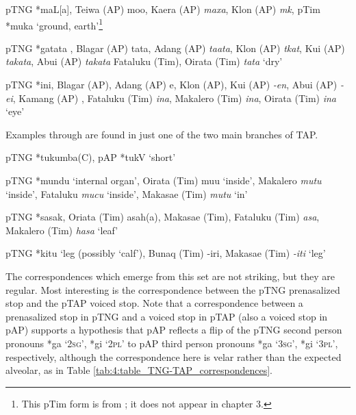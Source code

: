 \ea%
\label{ex:4:41}
\upshape   pTNG *maL[a], 
Teiwa (AP) mo{\pharfric}o{\textglotstop}, 
Kaera (AP) \textit{maxa}, 
Klon (AP) \textit{m{\textschwa}k{\textepsilon}{\textglotstop}}, 
pTim *muka `ground, earth'\footnote{This pTim form is from \citet{SchapperEtAl2012historical}; it does not appear in chapter 3.}  
\z

\ea%
\label{ex:4:42}
\upshape    pTNG *gatata , Blagar (AP) tata, Adang (AP) \textit{ta}\textit{{\textglotstop}}\textit{ata}, Klon (AP) \textit{t}\textit{{\textschwa}}\textit{kat}, Kui (AP) \textit{takata}, Abui (AP) \textit{takata} Fataluku (Tim), Oirata (Tim) \textit{tata} `dry'  
\z

\ea%
\label{ex:4:43}
\upshape  pTNG *ini, Blagar (AP), Adang (AP) e{\ng}, Klon (AP), Kui (AP) \textit{-en}, Abui (AP) \textit{-ei{\ng}}, Kamang (AP) \textit{{\ng}}, Fataluku (Tim) \textit{ina}, Makalero (Tim) \textit{ina}, Oirata (Tim) \textit{ina} `eye' 
   \z

Examples  through  are found in just one of the two main branches of TAP.

\ea%
\label{ex:4:44}
\upshape    pTNG *tukumba(C), pAP *tukV `short'  
\z

\ea%
\label{ex:4:45}
\upshape    pTNG *mundu `internal organ', Oirata (Tim) mu{\textrtailt}u `inside', Makalero \textit{mutu} `inside', Fataluku \textit{mucu }`inside', Makasae (Tim) \textit{mutu }`in'  
\z

\ea%
\label{ex:4:46}
\upshape    pTNG *sasak, Oriata (Tim) asah(a), Makasae (Tim), Fataluku (Tim) \textit{asa}, Makalero (Tim) \textit{hasa }`leaf'   
\z

\ea%
\label{ex:4:47}
\upshape    pTNG *kitu `leg (possibly `calf'), Bunaq (Tim) -iri, Makasae (Tim) \textit{-iti} `leg'  
\z

The correspondences which emerge from this set are not striking, but they are regular. Most interesting is the correspondence between the pTNG prenasalized stop and the pTAP voiced stop. Note that a correspondence between a prenasalized stop in pTNG and a voiced stop in pTAP (also a voiced stop in pAP) supports a hypothesis that pAP reflects a flip of the pTNG second person pronouns *{\ng}ga `\textsc{2sg}', *{\ng}gi `\textsc{2pl}' to pAP third person pronouns *ga `\textsc{3sg}', *gi `\textsc{3pl}', respectively, although the correspondence here is velar rather than the expected alveolar, as in Table \ref{tab:4:table_TNG-TAP_correspondences}.


